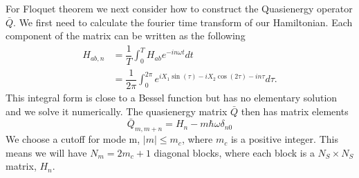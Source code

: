 For Floquet theorem we next consider how to construct the Quasienergy operator $\bar{Q}$.
We first need to calculate the fourier time transform of our Hamiltonian.
Each component of the matrix can be written as the following
\begin{align}
  H_{ab, n} &= \dfrac{1}{T} \int^T_0 H_{ab} e^{-i n \omega t} dt \nonumber \\
  &= \dfrac{1}{2\pi} \int^{2\pi}_0 e^{iX_1\sin(\tau) - iX_2\cos(2\tau) - i n \tau} d\tau.
\end{align}
This integral form is close to a Bessel function but has no elementary solution and we solve it numerically.
The quasienergy matrix $\bar{Q}$ then has matrix elements
\begin{equation}
  \bar{Q}_{m,m+n} = H_n - m \hbar \omega \delta_{n0}
\end{equation}
We choose a cutoff for mode m, $|m| \leq m_c$, where $m_c$ is a positive integer.
This means we will have $N_m = 2 m_c +1$ diagonal blocks, where each block is a $N_S \times N_S$ matrix, $H_n$.

